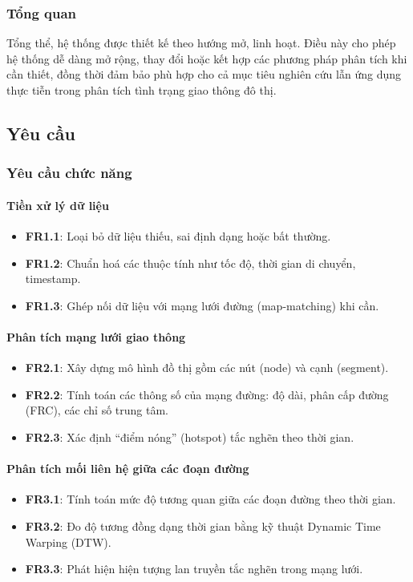 \subsubsection{Tổng quan}
Tổng thể, hệ thống được thiết kế theo hướng mở, linh hoạt. Điều này cho phép hệ thống dễ dàng mở rộng, thay đổi hoặc kết hợp các phương pháp phân tích khi cần thiết, đồng thời đảm bảo phù hợp cho cả mục tiêu nghiên cứu lẫn ứng dụng thực tiễn trong phân tích tình trạng giao thông đô thị.
\subsection{Yêu cầu}
\subsubsection{Yêu cầu chức năng}

\paragraph{Tiền xử lý dữ liệu}
\begin{itemize}
    \item \textbf{FR1.1}: Loại bỏ dữ liệu thiếu, sai định dạng hoặc bất thường.
    \item \textbf{FR1.2}: Chuẩn hoá các thuộc tính như tốc độ, thời gian di chuyển, timestamp.
    \item \textbf{FR1.3}: Ghép nối dữ liệu với mạng lưới đường (map-matching) khi cần.
\end{itemize}

\paragraph{Phân tích mạng lưới giao thông}
\begin{itemize}
    \item \textbf{FR2.1}: Xây dựng mô hình đồ thị gồm các nút (node) và cạnh (segment).
    \item \textbf{FR2.2}: Tính toán các thông số của mạng đường: độ dài, phân cấp đường (FRC), các chỉ số trung tâm.
    \item \textbf{FR2.3}: Xác định “điểm nóng” (hotspot) tắc nghẽn theo thời gian.
\end{itemize}

\paragraph{Phân tích mối liên hệ giữa các đoạn đường}
\begin{itemize}
    \item \textbf{FR3.1}: Tính toán mức độ tương quan giữa các đoạn đường theo thời gian.
    \item \textbf{FR3.2}: Đo độ tương đồng dạng thời gian bằng kỹ thuật Dynamic Time Warping (DTW).
    \item \textbf{FR3.3}: Phát hiện hiện tượng lan truyền tắc nghẽn trong mạng lưới.
\end{itemize}


